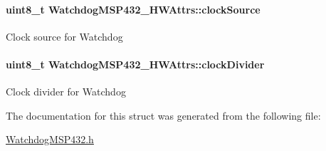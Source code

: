 \paragraph[{clock\+Source}]{\setlength{\rightskip}{0pt plus 5cm}uint8\+\_\+t Watchdog\+M\+S\+P432\+\_\+\+H\+W\+Attrs\+::clock\+Source}\label{struct_watchdog_m_s_p432___h_w_attrs_aa1318d649694d7c5537cc1f9594aac01}
Clock source for Watchdog 
\paragraph[{clock\+Divider}]{\setlength{\rightskip}{0pt plus 5cm}uint8\+\_\+t Watchdog\+M\+S\+P432\+\_\+\+H\+W\+Attrs\+::clock\+Divider}\label{struct_watchdog_m_s_p432___h_w_attrs_a047e52982463266b23febfd2835b538f}
Clock divider for Watchdog 

The documentation for this struct was generated from the following file\+:\begin{DoxyCompactItemize}
\item 
\hyperlink{_watchdog_m_s_p432_8h}{Watchdog\+M\+S\+P432.\+h}\end{DoxyCompactItemize}
